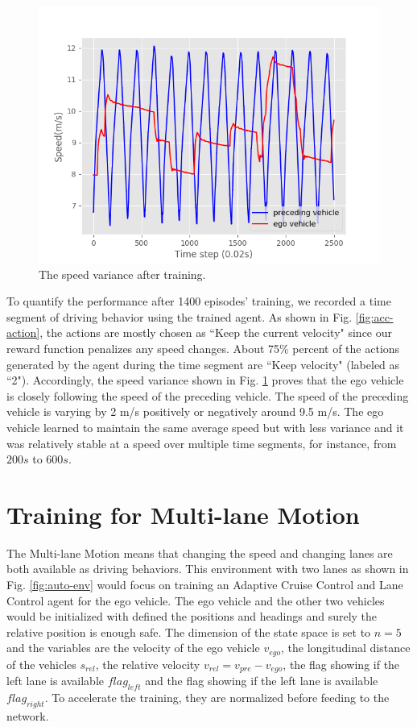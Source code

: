 \begin{figure}[h]
\centering
\includegraphics[width=1.0\textwidth]{figs/ch5/vel_variance}
\caption{The speed variance after training.}
\label{fig:acc-vel}
\end{figure}

To quantify the performance after 1400 episodes' training, we recorded a time segment of driving behavior using the trained agent. As shown in Fig. \ref{fig:acc-action}, the actions are mostly chosen as ``Keep the current velocity" since our reward function penalizes any speed changes. About 75\% percent of the actions generated by the agent during the time segment are ``Keep velocity" (labeled as ``2"). Accordingly, the speed variance shown in Fig. \ref{fig:acc-vel} proves that the ego vehicle is closely following the speed of the preceding vehicle. The speed of the preceding vehicle is varying by 2 m/s positively or negatively around 9.5 m/s. The ego vehicle learned to maintain the same average speed but with less variance and it was relatively stable at a speed over multiple time segments, for instance, from $200s$ to $600s$.

\section{Training for Multi-lane Motion}

The Multi-lane Motion means that changing the speed and changing lanes are both available as driving behaviors. This environment with two lanes as shown in Fig. \ref{fig:auto-env} would focus on training an Adaptive Cruise Control and Lane Control agent for the ego vehicle. The ego vehicle and the other two vehicles would be initialized with defined the positions and headings and surely the relative position is enough safe. The dimension of the state space is set to $n = 5$ and the variables are the velocity of the ego vehicle $v_{ego}$, the longitudinal distance of the vehicles $s_{rel}$, the relative velocity $v_{rel} = v_{pre} - v_{ego}$, the flag showing if the left lane is available $flag_{left}$ and the flag showing if the left lane is available $flag_{right}$. To accelerate the training, they are normalized before feeding to the network.

